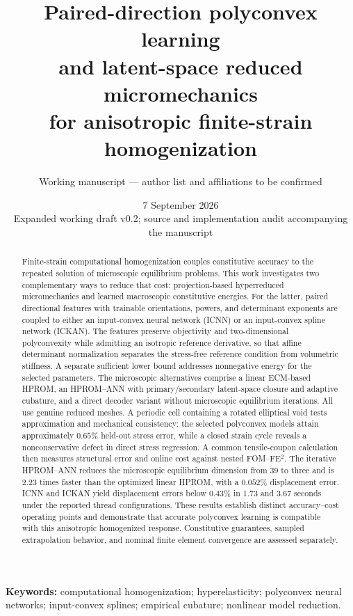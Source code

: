 \documentclass[10pt,a4paper]{article}
\title{Paired-direction polyconvex learning\protect\\
and latent-space reduced micromechanics\protect\\
for anisotropic finite-strain homogenization}
\author{Working manuscript --- author list and affiliations to be confirmed}
\date{7 September 2026\\\small Expanded working draft v0.2; source and implementation audit accompanying the manuscript}
\begin{document}
\maketitle
\begin{abstract}
Finite-strain computational homogenization couples constitutive accuracy to the repeated solution of microscopic equilibrium problems. This work investigates two complementary ways to reduce that cost: projection-based hyperreduced micromechanics and learned macroscopic constitutive energies. For the latter, paired directional features with trainable orientations, powers, and determinant exponents are coupled to either an input-convex neural network (ICNN) or an input-convex spline network (ICKAN). The features preserve objectivity and two-dimensional polyconvexity while admitting an isotropic reference derivative, so that affine determinant normalization separates the stress-free reference condition from volumetric stiffness. A separate sufficient lower bound addresses nonnegative energy for the selected parameters. The microscopic alternatives comprise a linear ECM-based HPROM, an HPROM--ANN with primary/secondary latent-space closure and adaptive cubature, and a direct decoder variant without microscopic equilibrium iterations. All use genuine reduced meshes. A periodic cell containing a rotated elliptical void tests approximation and mechanical consistency: the selected polyconvex models attain approximately $0.65\%$ held-out stress error, while a closed strain cycle reveals a nonconservative defect in direct stress regression. A common tensile-coupon calculation then measures structural error and online cost against nested FOM--FE$^2$. The iterative HPROM--ANN reduces the microscopic equilibrium dimension from 39 to three and is $2.23$ times faster than the optimized linear HPROM, with a $0.052\%$ displacement error. ICNN and ICKAN yield displacement errors below $0.43\%$ in 1.73 and 3.67 seconds under the reported thread configurations. These results establish distinct accuracy--cost operating points and demonstrate that accurate polyconvex learning is compatible with this anisotropic homogenized response. Constitutive guarantees, sampled extrapolation behavior, and nominal finite element convergence are assessed separately.
\end{abstract}
\noindent\textbf{Keywords:} computational homogenization; hyperelasticity; polyconvex neural networks; input-convex splines; empirical cubature; nonlinear model reduction.








\end{document}
